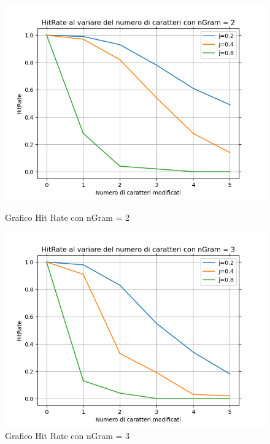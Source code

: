 \documentclass{article}
\begin{document}
\begin{figure}
    \centering
    \begin{minipage}{0.45\textwidth}
        
        \includegraphics[width=1.35\textwidth]{plotHitRate_nGram2.png} 
        \caption{Grafico Hit Rate con nGram = 2}
    \end{minipage}\hfill
    \begin{minipage}{0.45\textwidth}
       
        \includegraphics[width=1.35\textwidth]{plotHitRate_nGram3.png} 
        \caption{Grafico Hit Rate con nGram = 3}
    \end{minipage}
\end{figure}
\end{document}
